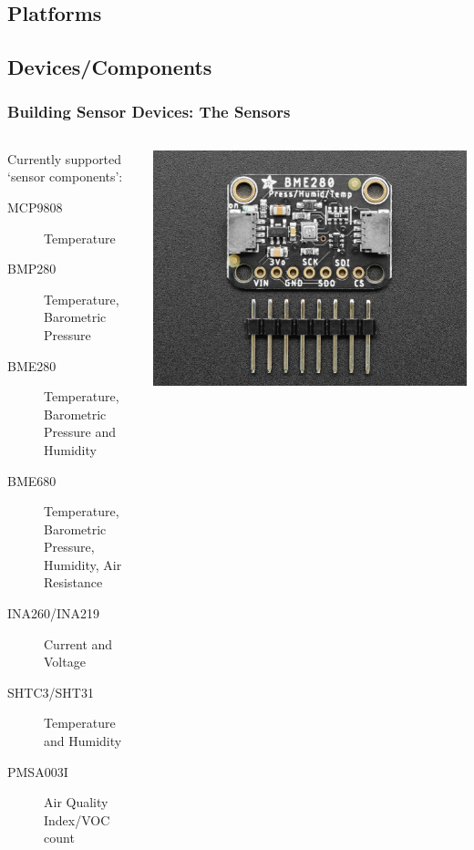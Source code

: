 \documentclass[aspectratio=169]{beamer}
\begin{document}
\subsection{Platforms}
\subsection{Devices/Components}
\begin{frame}[fragile]
  \frametitle{Building Sensor Devices: The Sensors}
  \begin{columns}[]
    \begin{column}[T]{0.45\paperwidth}
      Currently supported `sensor components':
      \begin{description}%
        \item[MCP9808]{Temperature}
        \item[BMP280]{Temperature, Barometric Pressure}
        \item[BME280]{Temperature, Barometric Pressure and Humidity}
        \item[BME680]{Temperature, Barometric Pressure, Humidity, Air Resistance}
        \item[INA260/INA219]{Current and Voltage}
        \item[SHTC3/SHT31]{Temperature and Humidity}
        \item[PMSA003I]{Air Quality Index/VOC count}
      \end{description}
    \end{column}
    \begin{column}[T]{0.45\paperwidth}
      \includegraphics[width=0.45\paperwidth,keepaspectratio]{images/bme280-ada.jpg}
    \end{column}
  \end{columns}
\end{frame}
\end{document}
